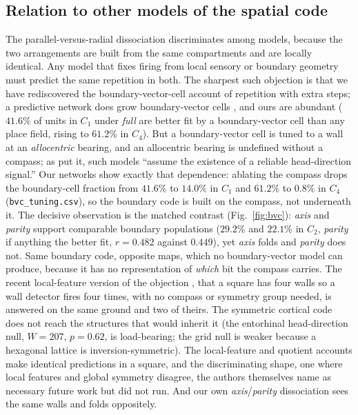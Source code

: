 \subsection*{Relation to other models of the spatial code}

The parallel-versus-radial dissociation discriminates among models, because the two arrangements are
built from the same compartments and are locally identical. Any model that fixes firing from local
sensory or boundary geometry must predict the same repetition in both. The sharpest such objection is
that we have rediscovered the boundary-vector-cell account of repetition \citep{grieves2018bvc} with
extra steps; a predictive network does grow boundary-vector cells \citep{uria2020}, and ours are
abundant ($41.6\%$ of units in $C_1$ under \textit{full} are better fit by a boundary-vector cell than
any place field, rising to $61.2\%$ in $C_4$). But a boundary-vector cell is tuned to a wall at an
\emph{allocentric} bearing, and an allocentric bearing is undefined without a compass; as
\citet{julian2018} put it, such models ``assume the existence of a reliable head-direction signal.'' Our
networks show exactly that dependence: ablating the compass drops the boundary-cell fraction from
$41.6\%$ to $14.0\%$ in $C_1$ and $61.2\%$ to $0.8\%$ in $C_4$ (\texttt{bvc\_tuning.csv}), so the
boundary code is built on the compass, not underneath it. The decisive observation is the matched
contrast (Fig.~\ref{fig:bvc}): \textit{axis} and \textit{parity} support comparable boundary populations
($29.2\%$ and $22.1\%$ in $C_2$, \textit{parity} if anything the better fit, $r = 0.482$ against
$0.449$), yet \textit{axis} folds and \textit{parity} does not. Same boundary code, opposite maps,
which no boundary-vector model can produce, because it has no representation of \emph{which} bit the
compass carries. The recent local-feature version of the objection \citep{lachance2024}, that a square
has four walls so a wall detector fires four times, with no compass or symmetry group needed, is
answered on the same ground and two of theirs. The symmetric cortical code does not reach the structures
that would inherit it (the entorhinal head-direction null, $W = 207$, $p = 0.62$, is load-bearing; the
grid null is weaker because a hexagonal lattice is inversion-symmetric). The local-feature and quotient
accounts make identical predictions in a square, and the discriminating shape, one where local features
and global symmetry disagree, the authors themselves name as necessary future work but did not run. And
our own \textit{axis}/\textit{parity} dissociation sees the same walls and folds oppositely.

